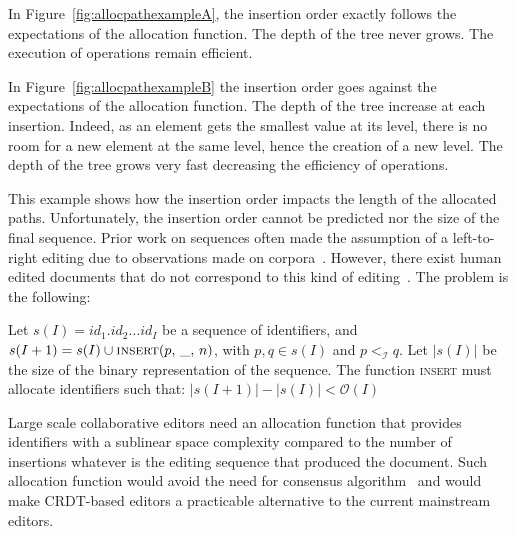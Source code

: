 In Figure~\ref{fig:allocpathexampleA}, the insertion order exactly follows the
expectations of the allocation function. The depth of the tree never grows. The
execution of operations remain efficient.

In Figure~\ref{fig:allocpathexampleB} the insertion order goes against the
expectations of the allocation function. The depth of the tree increase at each
insertion. Indeed, as an element gets the smallest value at its level, there is
no room for a new element at the same level, hence the creation of a new
level. The depth of the tree grows very fast decreasing the efficiency of
operations.


This example shows how the insertion order impacts the length of the allocated
paths. Unfortunately, the insertion order cannot be predicted nor the size of
the final sequence. Prior work on sequences often made the assumption of a
left-to-right editing due to observations made on
corpora~\cite{preguica2009commutative, weiss2009logoot}. However, there exist
human edited documents that do not correspond to this kind of
editing~\cite{nedelec2013lseq}. The problem is the following:
\begin{problem}
  Let $s(I)= id_1.id_2\ldots id_I$ be a sequence of identifiers, and
  $s(I+1) = s(I) \cup \textsc{insert}(p,\, \_,\, n)$, with $p,q \in s(I)$ and
  $p<_\mathcal{I}q$. Let $|s(I)|$ be the size of the binary representation of
  the sequence. The function \textsc{insert} must allocate identifiers such
  that: \hspace{30pt} $|s(I+1)| - |s(I)| < \mathcal{O}(I)$ %
\end{problem}

\noindent Large scale collaborative editors need an allocation function that
provides identifiers with a sublinear space complexity compared to the number of
insertions whatever is the editing sequence that produced the document. Such
allocation function would avoid the need for consensus
algorithm~\cite{mostefaoui2015signature} and would make CRDT-based editors a
practicable alternative to the current mainstream editors.

 
